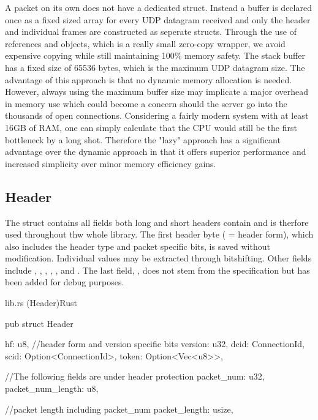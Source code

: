 A packet on its own does not have a dedicated struct. Instead a buffer is declared once as a fixed sized array for every UDP datagram received
and only the header and
individual frames are constructed as seperate structs. Through the use of references and  objects, which is a really small
zero-copy wrapper, we avoid expensive copying while still maintaining 100\% memory safety. The stack buffer has a fixed size of 65536
bytes, which is the maximum UDP datagram size. The advantage of this approach is that no dynamic memory allocation is needed. However,
always using the maximum buffer size may implicate a major overhead in memory use which could become a concern should the server go into
the thousands of open connections. Considering a fairly modern system with at least 16GB of RAM, one can simply calculate that the CPU
would still be the first bottleneck by a long shot. Therefore the "lazy" approach has a significant advantage over the dynamic approach in
that it offers superior performance and increased simplicity over minor memory efficiency gains.

\subsection{Header}

The  struct contains all fields both long and short headers contain and is therfore used throughout thw whole library.
The first header byte ( = header form), which also includes the header type and packet specific bits, is saved without
modification. Individual values may be extracted through bitshifting. Other fields include , , ,
, ,  and . The last field,
, does not stem from the specification but has been added for debug purposes.

\begin{codeblock}{lib.rs (Header)}{Rust}
  \begin{rustcode}
    pub struct Header {
        hf: u8, //header form and version specific bits
        version: u32,
        dcid: ConnectionId,
        scid: Option<ConnectionId>,
        token: Option<Vec<u8>>,

        //The following fields are under header protection
        packet_num: u32,
        packet_num_length: u8,

        //packet length including packet_num
        packet_length: usize,
    }
  \end{rustcode}
\end{codeblock}

